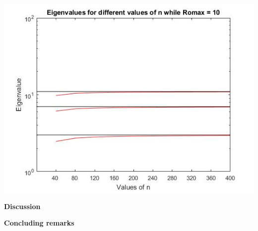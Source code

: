 \documentclass[10pt,a4paper]{article}
\begin{document}
\begin{center}
\includegraphics[scale=0.65]{rho10.jpg}
\end{center}



\newpage

\begin{center}
{\LARGE\bf Discussion}
\end{center}
\newpage

\begin{center}
{\LARGE\bf Concluding remarks}
\end{center}
\end{document}

